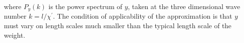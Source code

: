 \documentclass[12pt]{article}
\numberwithin{equation}{section}
\begin{document}
where $P_y(k)$ is the power spectrum of $y$, taken at the three dimensional wave number $k= l/\chi^\prime$. The condition of applicability of the approximation is that $y$ must vary on length scales much smaller than the typical length scale of the weight.

%
%
%
%
\end{document}

